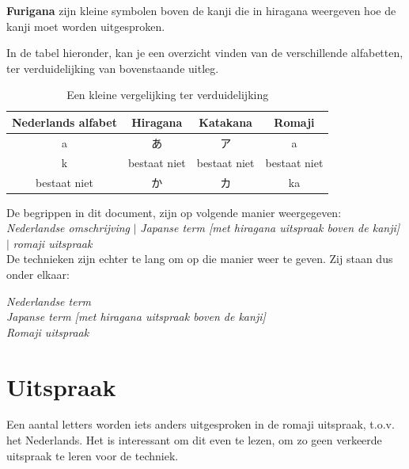 \documentclass[a4paper, 12pt]{article}
\begin{document}
\begin{CJK*}{UTF8}{min}
\noindent \textbf{Furigana} zijn kleine symbolen boven de kanji die in hiragana weergeven hoe de kanji moet worden uitgesproken.

\noindent In de tabel hieronder, kan je een overzicht vinden van de verschillende alfabetten, ter verduidelijking van bovenstaande uitleg.\\

\begin{table}[H]
\begin{center}
\begin{tabular}{c|c|c|c}
Nederlands alfabet & Hiragana & Katakana & Romaji\\
\hline
a &  あ & ア & a\\
k & bestaat niet & bestaat niet & bestaat niet\\
bestaat niet & か & カ & ka
\end{tabular}
\end{center}
\caption{Een kleine vergelijking ter verduidelijking}
\label{vergelijking_alfabetten}
\end{table}

\noindent De begrippen in dit document, zijn op volgende manier weergegeven:\\

\textit{Nederlandse omschrijving} $|$ \textit{Japanse term [met hiragana uitspraak boven de kanji]} $|$ \textit{romaji uitspraak}\\

\noindent De technieken zijn echter te lang om op die manier weer te geven. Zij staan dus onder elkaar:\\

\begin{center}
\textit{Nederlandse term}\\
\textit{Japanse term [met hiragana uitspraak boven de kanji]}\\
\textit{Romaji uitspraak}
\end{center}


\section{Uitspraak}
\noindent Een aantal letters worden iets anders uitgesproken in de romaji uitspraak, t.o.v. het Nederlands.
Het is interessant om dit even te lezen, om zo geen verkeerde uitspraak te leren voor de techniek.\\


\end{CJK*}
\end{document}
